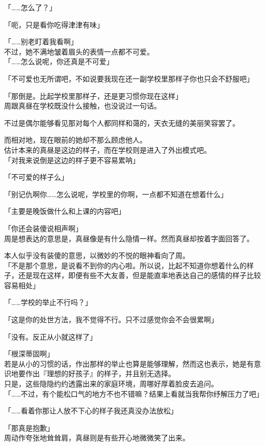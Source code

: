 「……怎么了？」

「呃，只是看你吃得津津有味」

「……别老盯着我看啊」\\

不过，她不满地皱着眉头的表情一点都不可爱。\\

「……怎么说呢，你还真是不可爱」

「不可爱也无所谓吧，不如说要我现在还一副学校里那样子你也只会不舒服吧」

「那倒是。比起学校里那样子，还是更习惯你现在这样」\\

周跟真昼在学校既没什么接触，也没说过一句话。

不过是偶尔能够看见那对每个人都同样和蔼的，天衣无缝的美丽笑容罢了。

而相对地，现在眼前的她却不那么顾虑他人。\\

估计本来的真昼是这边的样子，而在学校则是进入了外出模式吧。\\

「对我来说倒是这边的样子更不容易累呐」

「不可爱的样子么」

「别记仇啊你……怎么说呢，学校里的你啊，一点都不知道在想着什么」

「主要是晚饭做什么和上课的内容吧」

「你还会装傻说相声啊」\\

周是想表达的意思是，真昼像是有什么隐情一样。然而真昼却按着字面回答了。

本人似乎没有装傻的意思，以微妙的不悦的眼神看向了周。\\

「不是那个意思，是说看不到你的内心啦。所以说，比起不知道你想着什么的样子，还是现在这样，即便有些不大友善，但是能直率地表达自己的感情的样子比较容易相处」

「……学校的举止不行吗？」

「这是你的处世方法，我不觉得不行。只不过感觉你会不会很累啊」

「没有。反正从小就这样了」

「根深蒂固啊」\\

若是从小的习惯的话，作出那样的举止也算是能够理解，然而这也表示，她是有意识地要作出『理想的好孩子』的样子，并且别无选择。\\

只是，这些隐隐约约透露出来的家庭环境，周哪好厚着脸皮去追问。\\

「……不过，有个能松口气的地方不也不错嘛？结果上看就当我帮你纾解压力了吧」

「……看着你那让人放不下心的样子我还真没办法放松」

「那真是抱歉」\\

周动作夸张地耸耸肩，真昼则是有些开心地微微笑了出来。
